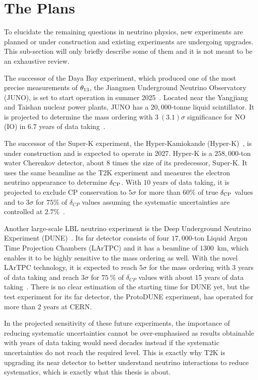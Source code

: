 \section{The Plans}
To elucidate the remaining questions in neutrino physics, new experiments are planned or under construction and existing experiments are undergoing upgrades.
This sub-section will only briefly describe some of them and it is not meant to be an exhaustive review.

The successor of the Daya Bay experiment, which produced one of the most precise measurements of $\theta_{13}$, the Jiangmen Underground Neutrino Observatory (JUNO), is set to start operation in summer 2025~\cite{ScienceNews2025}.
Located near the Yangjiang and Taishan nuclear power plants, JUNO has a $20,000$-tonne liquid scintillator.
It is projected to determine the mass ordering with $3~(3.1)\sigma$ significance for NO (IO) in $6.7$ years of data taking~\cite{Paoloni:2024atc}.

The successor of the Super-K experiment, the Hyper-Kamiokande (Hyper-K)~\cite{Hyper-Kamiokande:2018ofw}, is under construction and is expected to operate in 2027.
Hyper-K is a $258,000$-ton water Cherenkov detector, about $8$ times the size of its predecessor, Super-K.
It uses the same beamline as the T2K experiment and measures the electron neutrino appearance to determine $\delta_\textrm{CP}$.
With $10$ years of data taking, it is projected to exclude CP conservation to $5\sigma$ for more than $60\%$ of true $\delta_\textrm{CP}$ values and to $3\sigma$ for $75\%$ of $\delta_{CP}$ values assuming the systematic uncertainties are controlled at $2.7\%$~\cite{Jesus-Valls:2024ady}.

Another large-scale LBL neutrino experiment is the Deep Underground Neutrino Experiment (DUNE)~\cite{DUNE:2016hlj,DUNE:2015lol,DUNE:2016evb,DUNE:2016rla,DUNE:2021tad}.
Its far detector consists of four $17,000$-ton Liquid Argon Time Projection Chambers (LArTPC) and it has a beamline of $1300$~km, which enables it to be highly sensitive to the mass ordering as well.
With the novel LArTPC technology, it is expected to reach $5\sigma$ for the mass ordering with 3 years of data taking and reach $3\sigma$ for $75~\%$ of $\delta_{CP}$ values with about 15 years of data taking~\cite{Gil-Botella:2024duf}.
There is no clear estimation of the starting time for DUNE yet, but the test experiment for its far detector, the ProtoDUNE experiment, has operated for more than 2 years at CERN.

In the projected sensitivity of these future experiments, the importance of reducing systematic uncertainties cannot be over-emphasised as results obtainable with years of data taking would need decades instead if the systematic uncertainties do not reach the required level.
This is exactly why T2K is upgrading its near detector to better understand neutrino interactions to reduce systematics, which is exactly what this thesis is about.

